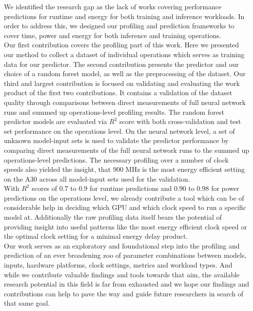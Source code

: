 
We identified the research gap as the lack of works covering performance predictions for runtime and energy for both training and inference workloads. In order to address this, we designed our profiling and prediction frameworks to cover time, power and energy for both inference and training operations. \\
Our first contribution covers the profiling part of this work. Here we presented our method to collect a dataset of individual operations which serves as training data for our predictor. The second contribution presents the predictor and our choice of a random forest model, as well as the preprocessing of the dataset. Our third and largest contribution is focused on validating and evaluating the work product of the first two contributions. It contains a validation of the dataset quality through comparisons between direct measurements of full neural network runs and summed up operations-level profiling results. The random forest predictor models are evaluated via $R^2$ score with both cross-validation and test set performance on the operations level. On the neural network level, a set of unknown model-input sets is used to validate the predictor performance by comparing direct measurements of the full neural network runs to the summed up operations-level predictions. The necessary profiling over a number of clock speeds also yielded the insight, that 900 MHz is the most energy efficient setting on the A30 across all model-input sets used for the validation. \\
With $R^2$ scores of $0.7$ to $0.9$ for runtime predictions and $0.90$ to $0.98$ for power predictions on the operations level, we already contribute a tool which can be of considerable help in deciding which GPU and which clock speed to run a specific model at. Additionally the raw profiling data itself bears the potential of providing insight into useful patterns like the most energy efficient clock speed or the optimal clock setting for a minimal energy delay product. \\
Our work serves as an exploratory and foundational step into the profiling and prediction of an ever broadening zoo of parameter combinations between models, inputs, hardware platforms, clock settings, metrics and workload types. And while we contribute valuable findings and tools towards that aim, the available research potential in this field is far from exhausted and we hope our findings and contributions can help to pave the way and guide future researchers in search of that same goal.